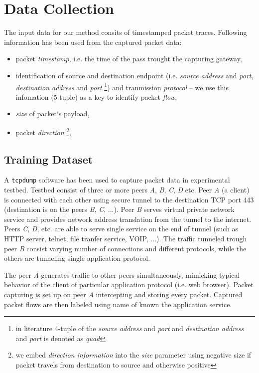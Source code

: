 \section{Data Collection}

The input data for our method consits of timestamped packet traces. 
Following information has been used from the captured packet data:
\begin{itemize}
	\item packet \emph{timestamp}, i.e. the time of the pass trought the capturing gateway,
	\item identification of source and destination endpoint 
	(i.e. \emph{source address } and \emph{port},
	\emph{destination address}  and \emph{port}
	\footnote{in literature 4-tuple of the  \emph{source address} and 
	\emph{port} and  \emph{destination address} and \emph{port} is 
	denoted as \emph{quad} %
	}) and tranmission \emph{protocol} -- we use this infomation (5-tuple) 
	as a key to identify packet \emph{flow},
	\item \emph{size} of packet`s payload,
	\item packet \emph{direction} \footnote{we embed \emph{direction information} 
	into the \emph{size} parameter using negative size  
	if packet travels from destination to source and otherwise positive},
\end{itemize}

\subsection{Training Dataset}

A \texttt{tcpdump} software \cite{jacobson2009tcpdump}  has been used to 
capture packet data in experimental testbed. 
Testbed consist of three or more peers \emph{A}, \emph{B}, \emph{C}, \emph{D}  etc. 
Peer \emph{A} (a client) is connected with each other using secure tunnel 
to the destination TCP port 443 (destination is on the peers \emph{B},  \emph{C}, ...).
Peer \emph{B} serves virtual private network service and provides network address
translation from the tunnel to the internet.
Peers \emph{C}, \emph{D}, etc. are able to serve single service on the end of tunnel 
(such as HTTP server, telnet, file tranfer service, VOIP, ...).
The traffic tunneled trough peer \emph{B} consist varying number of connections 
and different protocols,
while the others are tunneling single application protocol.

The peer \emph{A} generates traffic to other peers simultaneously, 
mimicking typical behavior of the client of particular application protocol 
(i.e. web browser).
Packet capturing is set up on peer \emph{A} intercepting and storing every packet.
Captured packet flows are then labeled using name of known the application service. 

